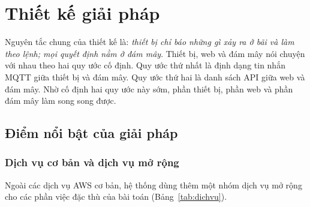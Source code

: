 \chapter{Thiết kế giải pháp}

Nguyên tắc chung của thiết kế là: \emph{thiết bị chỉ báo những gì xảy ra ở bãi và làm theo lệnh; mọi quyết định nằm ở đám mây}. Thiết bị, web và đám mây nói chuyện với nhau theo hai quy ước cố định. Quy ước thứ nhất là định dạng tin nhắn MQTT giữa thiết bị và đám mây. Quy ước thứ hai là danh sách API giữa web và đám mây. Nhờ cố định hai quy ước này sớm, phần thiết bị, phần web và phần đám mây làm song song được.

\section{Điểm nổi bật của giải pháp}

\subsection{Dịch vụ cơ bản và dịch vụ mở rộng}

Ngoài các dịch vụ AWS cơ bản, hệ thống dùng thêm một nhóm dịch vụ mở rộng cho các phần việc đặc thù của bài toán (Bảng~\ref{tab:dichvu}).

